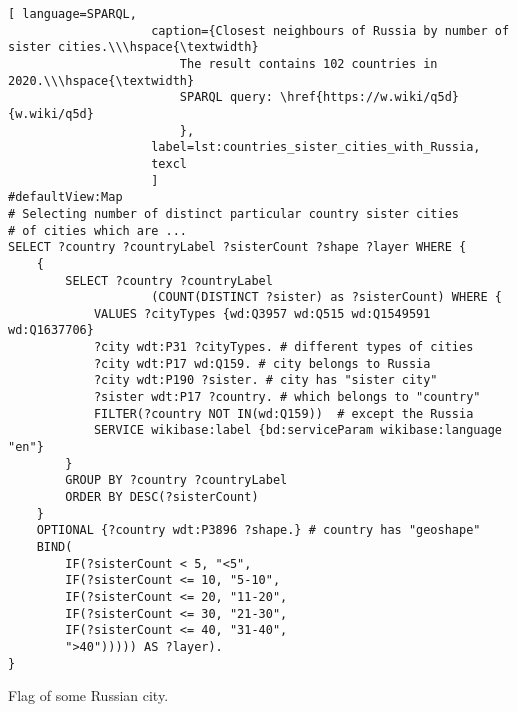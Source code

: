 \begin{lstlisting}[ language=SPARQL, 
                    caption={Closest neighbours of Russia by number of sister cities.\\\hspace{\textwidth}
                        The result contains 102 countries in 2020.\\\hspace{\textwidth}
                        SPARQL query: \href{https://w.wiki/q5d}{w.wiki/q5d}
                        },
                    label=lst:countries_sister_cities_with_Russia,
                    texcl 
                    ]
#defaultView:Map
# Selecting number of distinct particular country sister cities 
# of cities which are ...
SELECT ?country ?countryLabel ?sisterCount ?shape ?layer WHERE {
	{ 
		SELECT ?country ?countryLabel 
					(COUNT(DISTINCT ?sister) as ?sisterCount) WHERE {  
			VALUES ?cityTypes {wd:Q3957 wd:Q515 wd:Q1549591 wd:Q1637706}
			?city wdt:P31 ?cityTypes. # different types of cities
			?city wdt:P17 wd:Q159. # city belongs to Russia
			?city wdt:P190 ?sister. # city has "sister city"
			?sister wdt:P17 ?country. # which belongs to "country"
			FILTER(?country NOT IN(wd:Q159))  # except the Russia
			SERVICE wikibase:label {bd:serviceParam wikibase:language "en"}
		}
		GROUP BY ?country ?countryLabel
		ORDER BY DESC(?sisterCount)
	}
	OPTIONAL {?country wdt:P3896 ?shape.} # country has "geoshape"
	BIND(
		IF(?sisterCount < 5, "<5",
		IF(?sisterCount <= 10, "5-10",
		IF(?sisterCount <= 20, "11-20",
		IF(?sisterCount <= 30, "21-30",
		IF(?sisterCount <= 40, "31-40",
		">40"))))) AS ?layer).
}
\end{lstlisting}%


\begin{marginfigure}
{
\setlength{\fboxsep}{0pt}%
\setlength{\fboxrule}{1pt}%
%
}
  \caption{Flag of some Russian city.}%
\end{marginfigure}

